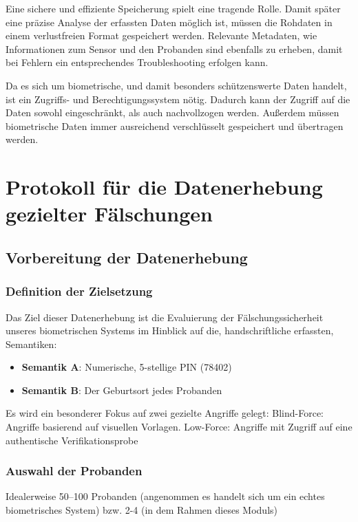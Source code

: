 \documentclass{article}
\begin{document}
Eine sichere und effiziente Speicherung spielt eine tragende Rolle. Damit später eine präzise Analyse der 
erfassten Daten möglich ist, müssen die Rohdaten in einem verlustfreien Format gespeichert werden. 
Relevante Metadaten, wie Informationen zum Sensor und den Probanden sind ebenfalls zu erheben, damit bei 
Fehlern ein entsprechendes Troubleshooting erfolgen kann.

Da es sich um biometrische, und damit besonders schützenswerte Daten handelt, ist ein Zugriffs- und 
Berechtigungssystem nötig. Dadurch kann der Zugriff auf die Daten sowohl eingeschränkt, als auch 
nachvollzogen werden. Außerdem müssen biometrische Daten immer ausreichend verschlüsselt gespeichert und 
übertragen werden.

\section{Protokoll für die Datenerhebung gezielter Fälschungen
}

\subsection{Vorbereitung der Datenerhebung}

\subsubsection{Definition der Zielsetzung}

Das Ziel dieser Datenerhebung ist die Evaluierung der Fälschungssicherheit unseres biometrischen Systems 
im Hinblick auf die, handschriftliche erfassten, Semantiken:

\begin{itemize}
	\item \textbf{Semantik A}: Numerische, 5-stellige PIN (78402)
	\item \textbf{Semantik B}: Der Geburtsort jedes Probanden
\end{itemize}

Es wird ein besonderer Fokus auf zwei gezielte Angriffe gelegt:
Blind-Force: Angriffe basierend auf visuellen Vorlagen.
Low-Force: Angriffe mit Zugriff auf eine authentische Verifikationsprobe

\subsubsection{Auswahl der Probanden}

Idealerweise 50–100 Probanden (angenommen es handelt sich um ein echtes biometrisches System) bzw. 2-4 (in 
dem Rahmen dieses Moduls)
\end{document}
